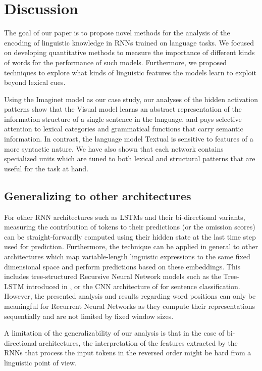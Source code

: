 \section{Discussion}
\label{sec:conclusion}

The goal of our paper is to propose novel methods for the
analysis of the encoding of linguistic knowledge in RNNs trained on language tasks.
We focused on developing quantitative methods to measure the importance
of different kinds of words for the performance of such models. Furthermore, we
proposed techniques to explore what kinds of linguistic features the models
learn to exploit beyond lexical cues.

Using the {\sc Imaginet} model as our case study,
our analyses of the hidden activation patterns show that the {\sc Visual} model
learns an abstract representation of the information structure of a single
sentence in the language, and pays selective attention to lexical categories and
grammatical functions that carry semantic information. In contrast,
the language model {\sc Textual} is sensitive to features of a more
syntactic nature. We have also shown that each network contains
specialized units which are tuned to both lexical and structural
patterns that are useful for the task at hand.


\subsection{Generalizing to other architectures}

For other RNN architectures such as LSTMs \label{edit:omitgeneral}
and their bi-directional variants, measuring the contribution
of tokens to their predictions (or the omission scores)
can be straight-forwardly computed using their hidden state
at the last time step used for prediction. Furthermore, the technique
can be applied in general to other architectures which
map variable-length linguistic expressions to the same fixed dimensional
space and perform predictions based on these embeddings.
This includes tree-structured Recursive Neural Network models such as the Tree-LSTM
introduced in \citep{kai2015treelstm}, or the CNN architecture of \citep{yoonneural2014}
for sentence classification.
However,
the presented analysis and results regarding word positions can only be meaningful
for Recurrent Neural Networks as they compute their representations sequentially and are not
limited by fixed window sizes.

A limitation of the generalizability of our
analysis is that in the case of
bi-directional architectures, the interpretation of the features
extracted by the RNNs that process the input tokens in the reversed order
might be hard from a linguistic point of view.

